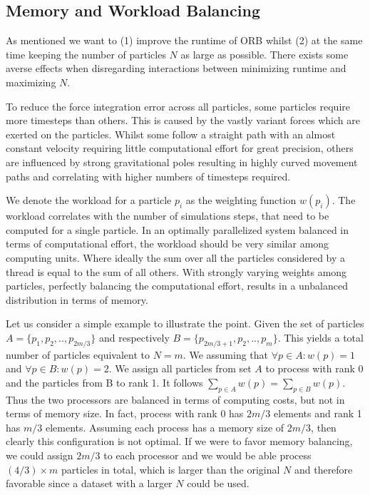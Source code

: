 \documentclass[]{article}
\begin{document}
\subsection{Memory and Workload Balancing}\label{balancing}
As mentioned we want to (1) improve the runtime of ORB whilst (2) at the same time keeping the number of particles $N$ as large as possible. There exists some averse effects when disregarding interactions between minimizing runtime and maximizing $N$.

To reduce the force integration error across all particles, some particles require more timesteps than others. This is caused by the vastly variant forces which are exerted on the particles. Whilst some follow a straight path with an almost constant velocity requiring little computational effort for great precision, others are influenced by strong gravitational poles resulting in highly curved movement paths and correlating with higher numbers of timesteps required.

We denote the workload for a particle $p_i$ as the weighting function $w(p_i)$. The workload correlates with the number of simulations steps, that need to be computed for a single particle. In an optimally parallelized system balanced in terms of computational effort, the workload should be very similar among computing units. Where ideally the sum over all the particles considered by a thread is equal to the sum of all others. With strongly varying weights among particles, perfectly balancing the computational effort, results in a unbalanced distribution in terms of memory. 

Let us consider a simple example to illustrate the point. Given the set of particles $A = \{p_1, p_2, .., p_{2m/3}\}$ and respectively $B = \{p_{2m/3 + 1}, p_2, .., p_{m}\}$. This yields a total number of particles equivalent to $N = m$. We assuming that $\forall p \in A : w(p) = 1$ and $\forall p \in B : w(p) = 2$. 
We assign all particles from set $A$ to process with rank 0 and the particles from B to rank 1. It follows $\sum_{p\in A} w(p) = \sum_{p\in B} w(p)$. Thus the two processors are balanced in terms of computing costs, but not in terms of memory size. In fact, process with rank 0 has $2m/3$ elements and rank 1 has $m/3$ elements. Assuming each process has a memory size of $2m/3$, then clearly this configuration is not optimal. If we were to favor memory balancing, we could assign $2m/3$ to each processor and we would be able process $(4/3) \times m$ particles in total, which is larger than the original $N$ and therefore favorable since a dataset with a larger $N$ could be used.
\end{document}

